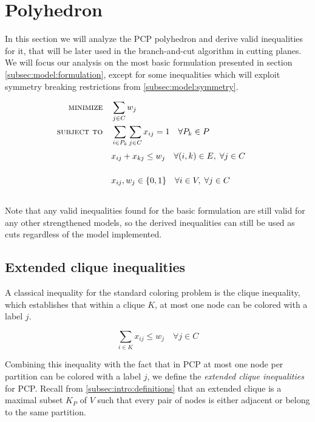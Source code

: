 \section{Polyhedron}

In this section we will analyze the PCP polyhedron and derive valid inequalities for it, that will be later used in the branch-and-cut algorithm in cutting planes. We will focus our analysis on the most basic formulation presented in section \ref{subsec:model:formulation}, except for some inequalities which will exploit symmetry breaking restrictions from \ref{subsec:model:symmetry}. 

\begin{align}
\text{\textsc{minimize}} \quad & \sum_{j \in C} w_j \nonumber \\
\text{\textsc{subject to}} \quad & \sum_{i \in P_k} \sum_{j \in C} x_{ij} = 1 \quad \forall P_k \in P \nonumber \\
& x_{ij} + x_{kj} \leq w_j \quad \forall (i,k) \in E, \; \forall j \in C \sumheight \nonumber \\
& x_{ij}, w_{j} \in \{0,1\} \quad \forall i \in V, \; \forall j \in C \sumheight \nonumber
\end{align}

Note that any valid inequalities found for the basic formulation are still valid for any other strengthened models, so the derived inequalities can still be used as cuts regardless of the model implemented.

\subsection{Extended clique inequalities}

A classical inequality for the standard coloring problem is the clique inequality, which establishes that within a clique $K$, at most one node can be colored with a label $j$.

\begin{equation}
\nonumber
\sum_{i \in K} x_{ij} \leq w_{j} \quad \forall j \in C
\end{equation}

Combining this inequality with the fact that in PCP at most one node per partition can be colored with a label $j$, we define the \textit{extended clique inequalities} for PCP. Recall from \ref{subsec:intro:definitions} that an extended clique is a maximal subset $K_P$ of $V$ such that every pair of nodes is either adjacent or belong to the same partition.

